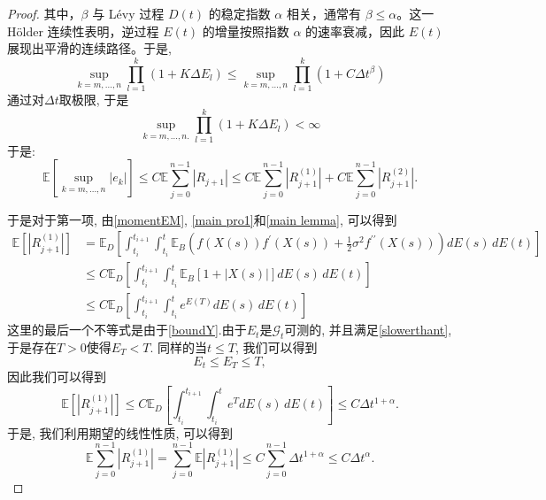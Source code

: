 \begin{proof}
	其中，\( \beta \) 与 Lévy 过程 \( D(t) \) 的稳定指数 \( \alpha \) 相关，通常有 \( \beta \leq \alpha \)。这一 Hölder 连续性表明，逆过程 \( E(t) \) 的增量按照指数 \( \alpha \) 的速率衰减，因此 \( E(t) \) 展现出平滑的连续路径。于是, 
	\begin{equation*}
		\sup\limits_{k=m ,\ldots ,n} \prod\limits_{l=1}^{k}(1+K\Delta E_l) \leq \sup\limits_{k=m,\ldots, n} \prod\limits_{l=1}^{k}(1+C\Delta t^{\beta})
	\end{equation*}
	通过对$\Delta t$取极限, 
	于是
	\begin{equation*}
		\sup\limits_{k=m, \ldots, n. } \prod\limits_{l=1}^{k}(1+K\Delta E_l) < \infty
	\end{equation*}
	于是:
	\begin{equation}
		\mathbb{E}\left[\sup\limits_{k=m, \ldots, n}\left|e_k\right|\right] \leq C\mathbb{E}\sum_{j=0}^{n-1}|R_{j+1}| \leq C\mathbb{E}\sum\limits_{j=0}^{n-1}|R_{j+1}^{(1)}| + C\mathbb{E}\sum\limits_{j=0}^{n-1}|R_{j+1}^{(2)}|. 
	\end{equation}
	
	于是对于第一项,  由\cref{momentEM}, \cref{main pro1}和\cref{main lemma}, 可以得到
	\begin{align*}
		\mathbb{E} \left[|R_{j+1}^{(1)}| \right] &= \mathbb{E}_D \left[
		\int_{t_i}^{t_{i+1}} \int_{t_i}^{t}  \mathbb{E}_B \left( f(X(s)) f^{\prime}(X(s)) + \frac{1}{2} \sigma^2 f^{\prime\prime}(X(s)) \right) dE(s) \, dE(t)
		\right] \\
		&\le C\mathbb{E}_D \left[
		\int_{t_i}^{t_{i+1}} \int_{t_i}^{t}  \mathbb{E}_B \left[1+|X(s)| \right] dE(s) \, dE(t)
		\right] \\
		& \le C\mathbb{E}_D \left[
		\int_{t_i}^{t_{i+1}} \int_{t_i}^{t}  e^{E(T)} dE(s) \, dE(t)
		\right] 
	\end{align*}
	这里的最后一个不等式是由于\cref{boundY}.由于$E_t$是$\mathcal{G}_t$可测的, 并且满足\cref{slowerthant}, 于是存在$T>0$使得$E_T < T $. 同样的当$t \le T$, 我们可以得到
	\begin{equation}\label{boundE}
		E_t \leq E_T \leq T,
	\end{equation}
	因此我们可以得到
	\begin{equation*}
		\mathbb{E} \left[|R_{j+1}^{(1)}| \right]  \le C\mathbb{E}_D \left[
		\int_{t_i}^{t_{i+1}} \int_{t_i}^{t}  e^T dE(s) \, dE(t)
		\right] \le C\Delta t^{1+\alpha}. 
	\end{equation*}
	 于是, 我们利用期望的线性性质, 可以得到
	\begin{equation}\label{R1}
		\mathbb{E}\sum\limits_{j=0}^{n-1}|R_{j+1}^{(1)}|= \sum\limits_{j=0}^{n-1}\mathbb{E}|R_{j+1}^{(1)}| \leq
		C\sum\limits_{j=0}^{n-1}\Delta t^{1+\alpha} \le C\Delta t^\alpha. 
	\end{equation}
	

\end{proof}
